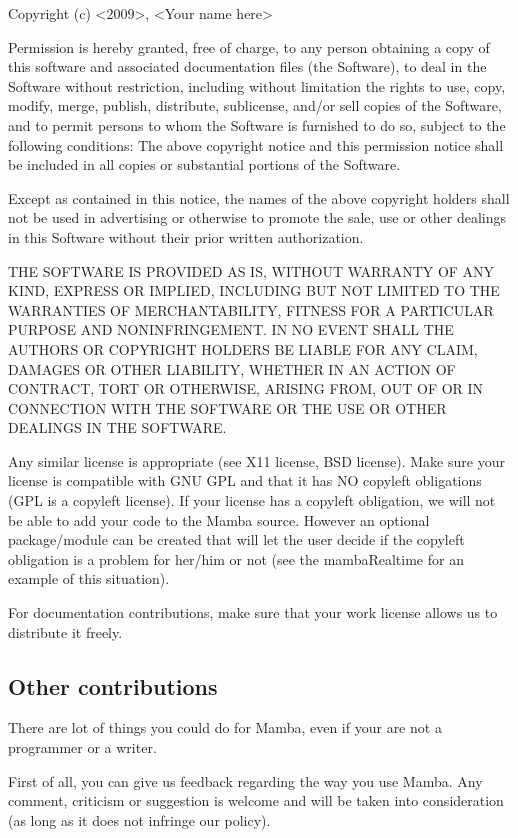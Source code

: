 \documentclass[a4paper,10pt,oneside]{article}
\begin{document}
\begin{minipage}[c]{0.8\textwidth}%
 {\small Copyright (c) <2009>, <Your name here>}{\small \vspace{0.5cm} \par}

{\small Permission is hereby granted, free of charge, to any person
obtaining a copy of this software and associated documentation files
(the \textquotedbl{}Software\textquotedbl{}), to deal in the Software
without restriction, including without limitation the rights to use,
copy, modify, merge, publish, distribute, sublicense, and/or sell
copies of the Software, and to permit persons to whom the Software
is furnished to do so, subject to the following conditions: The above
copyright notice and this permission notice shall be included in all
copies or substantial portions of the Software.}{\small \vspace{0.5cm} \par}

{\small Except as contained in this notice, the names of the above copyright 
holders shall not be used in advertising or otherwise to promote the sale, use 
or other dealings in this Software without their prior written authorization.}
{\small \vspace{0.5cm} \par}

{\small THE SOFTWARE IS PROVIDED \textquotedbl{}AS IS\textquotedbl{},
WITHOUT WARRANTY OF ANY KIND, EXPRESS OR IMPLIED, INCLUDING BUT NOT
LIMITED TO THE WARRANTIES OF MERCHANTABILITY, FITNESS FOR A PARTICULAR
PURPOSE AND NONINFRINGEMENT. IN NO EVENT SHALL THE AUTHORS OR COPYRIGHT
HOLDERS BE LIABLE FOR ANY CLAIM, DAMAGES OR OTHER LIABILITY, WHETHER
IN AN ACTION OF CONTRACT, TORT OR OTHERWISE, ARISING FROM, OUT OF
OR IN CONNECTION WITH THE SOFTWARE OR THE USE OR OTHER DEALINGS IN
THE SOFTWARE. }%
\vspace{1cm}
\end{minipage}

Any similar license is appropriate (see X11 license, BSD license). Make sure
your license is compatible with GNU GPL and that it has NO copyleft
obligations (GPL is a copyleft license). If your license has a copyleft
obligation, we will not be able to add your code to the Mamba source. However
an optional package/module can be created that will let the user decide if the
copyleft obligation is a problem for her/him or not (see the mambaRealtime for
an example of this situation).

For documentation contributions, make sure that your work license
allows us to distribute it freely.

\subsection{Other contributions}

There are lot of things you could do for Mamba, even if your are not
a programmer or a writer.

First of all, you can give us feedback regarding the way you use Mamba.
Any comment, criticism or suggestion is welcome and will be taken
into consideration (as long as it does not infringe our policy).
\end{document}
